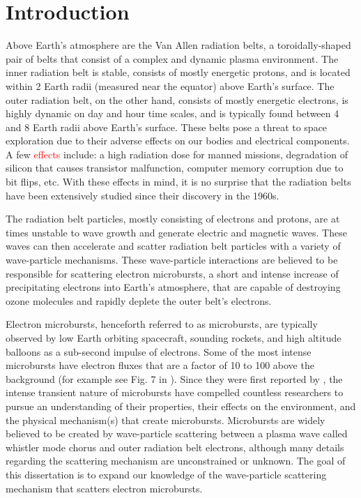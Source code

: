 \chapter{Introduction}\label{CH:introduction}
Above Earth's atmosphere are the Van Allen radiation belts, a toroidally-shaped pair of belts that consist of a complex and dynamic plasma environment. The inner radiation belt is stable, consists of mostly energetic protons, and is located within 2 Earth radii (measured near the equator) above Earth's surface. The outer radiation belt, on the other hand, consists of mostly energetic electrons, is highly dynamic on day and hour time scales, and is typically found between 4 and 8 Earth radii above Earth's surface. These belts pose a threat to space exploration due to their adverse effects on our bodies and electrical components. A few \textcolor{red}{effects} include: a high radiation dose for manned missions, degradation of silicon that causes transistor malfunction, computer memory corruption due to bit flips, etc. With these effects in mind, it is no surprise that the radiation belts have been extensively studied since their discovery in the 1960s.

The radiation belt particles, mostly consisting of electrons and protons, are at times unstable to wave growth and generate electric and magnetic waves. These waves can then accelerate and scatter radiation belt particles with a variety of wave-particle mechanisms. These wave-particle interactions are believed to be responsible for scattering electron microbursts, a short and intense increase of precipitating electrons into Earth's atmosphere, that are capable of destroying ozone molecules and rapidly deplete the outer belt's electrons.

Electron microbursts, henceforth referred to as microbursts, are typically observed by low Earth orbiting spacecraft, sounding rockets, and high altitude balloons as a sub-second impulse of electrons. Some of the most intense microbursts have electron fluxes that are a factor of 10 to 100 above the background (for example see Fig. 7 in \citet{Blake1996}). Since they were first reported by \citet{Anderson1964}, the intense transient nature of microbursts have compelled countless researchers to pursue an understanding of their properties, their effects on the environment, and the physical mechanism(s) that create microbursts. Microbursts are widely believed to be created by wave-particle scattering between a plasma wave called whistler mode chorus and outer radiation belt electrons, although many details regarding the scattering mechanism are unconstrained or unknown. The goal of this dissertation is to expand our knowledge of the wave-particle scattering mechanism that scatters electron microbursts.

